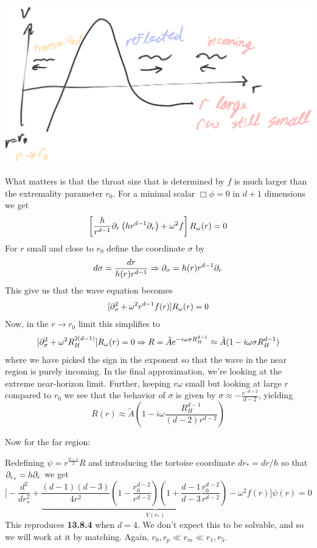 \documentclass[11pt, class=article, crop=false]{standalone}
\begin{document}
\begin{enumerate}
	\begin{center}
		\includegraphics[scale=0.2]{"Drawings/BH Scatter"}
	\end{center}
	
	 What matters is that the throat size that is determined by $f$ is much larger than the extremality parameter $r_0$. For a minimal scalar $\Box \phi = 0$ in $d+1$ dimensions we get
	\[
		\left[\frac{h}{r^{d-1}} \partial_r \left(h r^{d-1} \partial_r \right) + \omega^2 f \right] R_\omega (r) = 0
	\]
	For $r$ small and close to $r_0$ define the coordinate $\sigma$ by
	\[
		d\sigma = \frac{dr}{h(r) r^{d-1}} \Rightarrow \partial_\sigma = h(r) r^{d-1} \partial_r
	\]
	This give us that the wave equation becomes
	\[
		[\partial_\sigma^2 + \omega^2 r^{d-1} f(r)] R_\omega (r) = 0
	\]
	Now, in the $r \to r_0$ limit this simplifies to
	\[
		[\partial_\sigma^2 + \omega^2 R_H^{2(d-1)}] R_\omega(r) = 0 \Rightarrow R = \tilde A e^{-i \omega \sigma R_H^{d-1}} \approx \tilde A ( 1 - i \omega \sigma R_H^{d-1})
	\]
	where we have picked the sign in the exponent so that the wave in the near region is purely incoming. In the final approximation, we're looking at the extreme near-horizon limit. Further, keeping $r \omega$ small but looking at large $r$ compared to $r_0$ we see that the behavior of $\sigma$ is given by $\sigma \approx -\frac{r^{-d+2}}{d-2}$, yielding 
	\begin{equation}\label{eq:near_zone}
		 R(r) \approx \tilde A (1 - i \omega \frac{R_H^{d-1}}{(d-2) r^{d-2}})
	\end{equation}
	
	Now for the far region:
	
	Redefining $\psi = r^{\frac{d-1}{2}} R$ and introducing the tortoise coordinate $dr_* = dr/h$ so that $\partial_{r_*} = h \partial_r$ we get
	\[
		\Big[- \frac{d^2}{dr_*^2} + \underbrace{\frac{(d-1)(d-3)}{4 r^2} \left(1 - \frac{r_0^{d-2}}{r^{d-2}} \right) \left(1+ \frac{d-1}{d-3} \frac{r_0^{d-2}}{r^{d-2}}\right) - \omega^2 f(r)}_{V(r_*)} \Big] \psi(r) = 0
	\]
	This reproduces \textbf{13.8.4} when $d=4$.
	We don't expect this to be solvable, and so we will work at it by matching. Again, $r_0, r_p \ll r_m \ll r_1, r_5$.


\end{enumerate}
\end{document}
